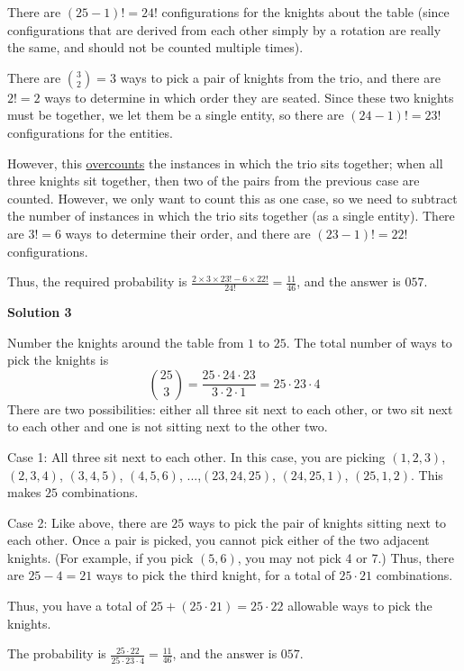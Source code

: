 \begin{enumerate}
There are $(25-1)! = 24!$ configurations for the knights about the table (since configurations that are derived from each other simply by a rotation are really the same, and should not be counted multiple times). 

 There are ${3\choose 2} = 3$ ways to pick a pair of knights from the trio, and there are $2! = 2$ ways to determine in which order they are seated. Since these two knights must be together, we let them be a single entity, so there are $(24-1)! = 23!$ configurations for the entities. 

 However, this \href{https://artofproblemsolving.com/wiki/index.php?title=Principle\_of\_Inclusion-Exclusion}{overcounts} the instances in which the trio sits together; when all three knights sit together, then two of the pairs from the previous case are counted. However, we only want to count this as one case, so we need to subtract the number of instances in which the trio sits together (as a single entity). There are $3! = 6$ ways to determine their order, and there are $(23-1)! = 22!$ configurations.

 Thus, the required probability is $\frac{2 \times 3 \times 23! - 6 \times 22!}{24!} = \frac{11}{46}$, and the answer is $\boxed{057}$.

 



\textbf{Solution 3}

Number the knights around the table from $1$ to $25$. The total number of ways to pick the knights is 
 \[{25\choose 3} = \frac{25\cdot24\cdot23}{3\cdot2\cdot1} = 25\cdot23\cdot4\]There are two possibilities: either all three sit next to each other, or two sit next to each other and one is not sitting next to the other two.

 Case 1:  All three sit next to each other.  In this case, you are picking $(1,2,3)$, $(2,3,4)$, $(3,4,5)$, $(4,5,6)$, ...,$(23,24,25)$, $(24,25,1)$, $(25,1,2)$.  This makes $25$ combinations.

 Case 2:  Like above, there are $25$ ways to pick the pair of knights sitting next to each other.  Once a pair is picked, you cannot pick either of the two adjacent knights. (For example, if you pick $(5,6)$, you may not pick 4 or 7.) Thus, there are $25-4=21$ ways to pick the third knight, for a total of $25\cdot21$ combinations.

 Thus, you have a total of $25 + (25\cdot21) = 25\cdot22$ allowable ways to pick the knights.    

 The probability is $\frac{25\cdot22}{25\cdot23\cdot4} = \frac{11}{46}$, and the answer is $\boxed{057}$.


\end{enumerate}

